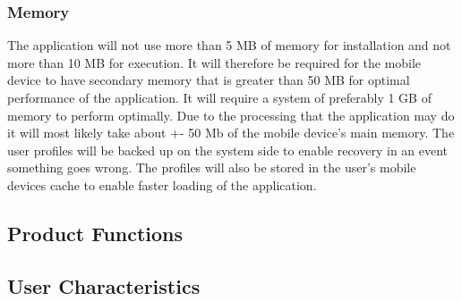 \documentclass[12pt,a4paper]{article}
\begin{document}
		\subsubsection{Memory}
			The application will not use more than 5 MB of memory for installation and not more than 10 MB for execution. It will therefore be required for the mobile device to have secondary memory that is greater than 50 MB for optimal performance of the application. It will require a system of preferably 1 GB of memory to perform optimally. Due to the processing that the application may do it will most likely take about +- 50 Mb of the mobile device's main memory. The user profiles will be backed up on the system side to enable recovery in an event something goes wrong. The profiles will also be stored in the user’s mobile devices cache to enable faster loading of the application.
	\subsection{Product Functions}
	\subsection{User Characteristics}
\end{document}
